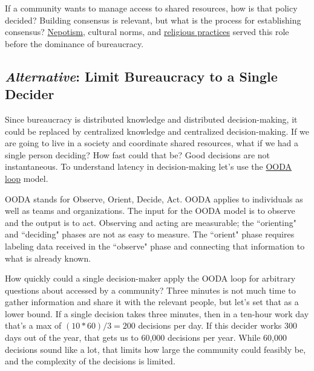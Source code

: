 If a community wants to manage access to shared resources, how is that policy decided?  Building consensus is relevant, but what is the process for establishing consensus? 
\href{https://en.wikipedia.org/wiki/Nepotism}{Nepotism},
\iftoggle{WPinmargin}{\marginpar{$>$Wikipedia: Nepotism}}{}%
cultural norms, and 
\href{https://en.wikipedia.org/wiki/Religion}{religious practices}
served this role before the dominance of bureaucracy. 


\subsection*{\textit{Alternative}: Limit Bureaucracy to a Single Decider\label{sec:single-decider}}

Since bureaucracy is distributed knowledge and distributed decision-making, it could be replaced by centralized knowledge and centralized decision-making. If we are going to live in a society and coordinate shared resources, what if we had a single person deciding? How fast could that be? Good decisions are not instantaneous. To understand latency in decision-making let's use the
\href{https://en.wikipedia.org/wiki/OODA_loop}{OODA loop} 
\iftoggle{WPinmargin}{\marginpar{$>$Wikipedia: OODA loop}}{}%
model. 

OODA stands for Observe, Orient, Decide, Act. OODA applies to individuals as well as teams and organizations. 
The input for the OODA model is to observe and the output is to act. Observing and acting are measurable; the ``orienting" and ``deciding" phases are not as easy to measure. The ``orient" phase requires labeling data received in the ``observe" phase and connecting that information to what is already known.

How quickly could a single decision-maker apply the OODA loop for arbitrary questions about \iftoggle{glossarysubstitutionworks}{\glspl{shared resource}}{shared resources} accessed by a community? Three minutes is not much time to gather information and share it with the relevant people, but let's set that as a lower bound.
If a single decision takes three minutes, then in a ten-hour work day that's a max of $(10*60)/3 = 200$ decisions per day. If this decider works 300 days out of the year, that gets us to 60,000 decisions per year. While 60,000 decisions sound like a lot, that limits how large the community could feasibly be, and the complexity of the decisions is limited. 


